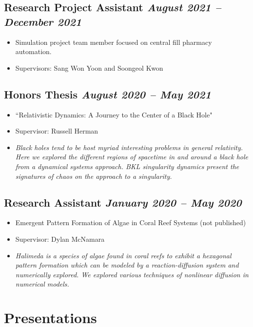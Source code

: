 \documentclass[12pt]{article}
\begin{document}
\subsection{Research Project Assistant \hfill \textit{August 2021 -- December 2021}}
\begin{itemize}
    \itemsep = 0em
    \item[] Simulation project team member focused on central fill pharmacy automation.
    \item[] Supervisors: Sang Won Yoon and Soongeol Kwon
\end{itemize}

\subsection{Honors Thesis \hfill \textit{August 2020 -- May 2021}}
\begin{itemize}
    \itemsep = 0em
    \item[] ``Relativistic Dynamics: A Journey to the Center of a Black Hole"
    \item[] Supervisor: Russell Herman
    \item[] \textit{Black holes tend to be host myriad interesting problems in general relativity. Here we explored the different regions of spacetime in and around a black hole from a dynamical systems approach. BKL singularity dynamics present the signatures of chaos on the approach to a singularity.}
\end{itemize}

\subsection{Research Assistant \hfill \textit{January 2020 -- May 2020}}
\begin{itemize}
    \itemsep = 0em
    \item[] Emergent Pattern Formation of Algae in Coral Reef Systems (not published)
    \item[] Supervisor: Dylan McNamara
    \item[] \textit{Halimeda is a species of algae found in coral reefs to exhibit a hexagonal pattern formation which can be modeled by a reaction-diffusion system and numerically explored. We explored various techniques of nonlinear diffusion in numerical models.}
\end{itemize}

\section{Presentations}
\end{document}
